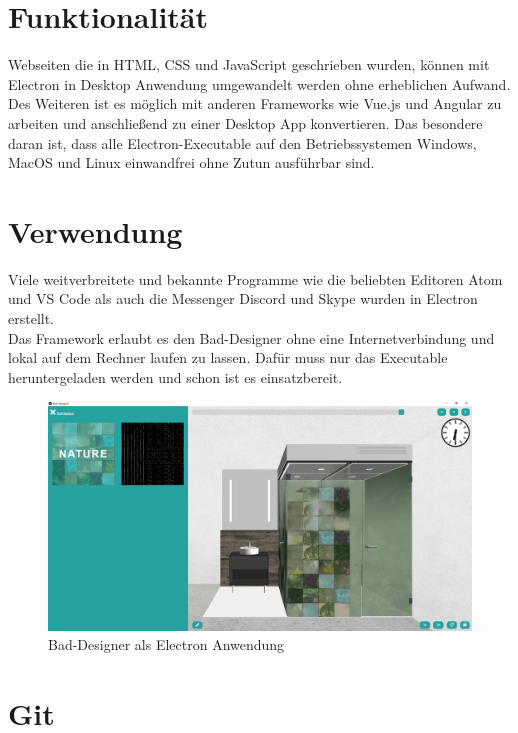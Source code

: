 \section*{Funktionalität}
Webseiten die in HTML, CSS und JavaScript geschrieben wurden, können mit Electron in Desktop Anwendung umgewandelt werden ohne erheblichen Aufwand. Des Weiteren ist es möglich mit anderen Frameworks wie Vue.js und Angular zu arbeiten und anschließend zu einer Desktop App konvertieren. Das besondere daran ist, dass alle Electron-Executable auf den Betriebssystemen Windows, MacOS und Linux einwandfrei ohne Zutun ausführbar sind.


\section*{Verwendung}
Viele weitverbreitete und bekannte Programme wie die beliebten Editoren Atom und VS Code als auch die Messenger Discord und Skype wurden in Electron erstellt.
\\
Das Framework erlaubt es den Bad-Designer ohne eine Internetverbindung und lokal auf dem Rechner laufen zu lassen. Dafür muss nur das Executable heruntergeladen werden und schon ist es einsatzbereit.


\begin{figure}
	\begin{center}
		\includegraphics[width=16cm]{images/Electron_BD.png}
		\caption{Bad-Designer als Electron Anwendung}

	\end{center}
\end{figure}


\newpage
\clearpage
\section{Git}\label{sec:Git}
